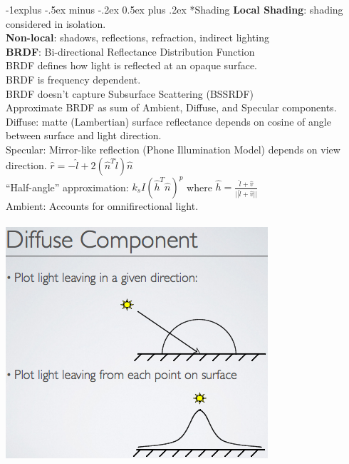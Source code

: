 \documentclass[3pt,landscape]{article}
\makeatletter
\renewcommand{\subsection}{\@startsection{subsection}{2}{0mm}%
                            {-1explus -.5ex minus -.2ex}%
                            {0.5ex plus .2ex}%
                            {\normalfont\normalsize\bfseries}}
\makeatother
\begin{document}
\begin{multicols}{3}
\subsection*{Shading}
{\bf Local Shading}: shading considered in isolation.\\
{\bf Non-local}: shadows, reflections, refraction, indirect lighting\\
{\bf BRDF}: Bi-directional Reflectance Distribution Function\\
BRDF defines how light is reflected at an opaque surface.\\
BRDF is frequency dependent.\\
BRDF doesn't capture Subsurface Scattering (BSSRDF)\\
Approximate BRDF as sum of Ambient, Diffuse, and Specular components.\\
Diffuse: matte (Lambertian) surface reflectance depends on cosine of angle between surface and light direction.\\
Specular: Mirror-like reflection (Phone Illumination Model) depends on view direction. \(\hat{r}=-\hat{l}+2(\hat{n}^T\hat{l})\hat{n}\)\\
``Half-angle'' approximation: \(k_sI(\hat{h}^T\hat{n})^p\) where \(\hat{h}=\frac{\hat{l}+\hat{v}}{||\hat{l}+\hat{v}||}\)\\
Ambient: Accounts for omnifirectional light.\\
\\
\includegraphics[scale=0.32]{images/diffuse}

\end{multicols}
\end{document}
